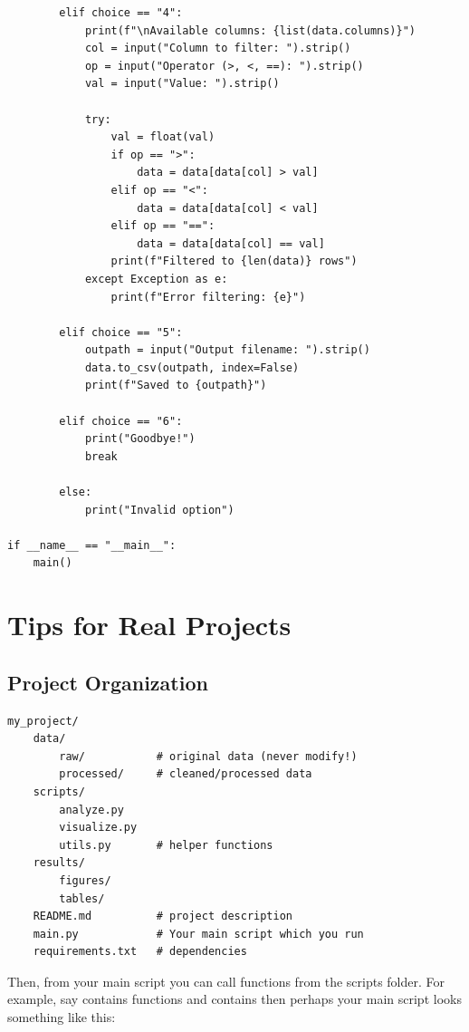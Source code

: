 \begin{lstlisting}
        elif choice == "4":
            print(f"\nAvailable columns: {list(data.columns)}")
            col = input("Column to filter: ").strip()
            op = input("Operator (>, <, ==): ").strip()
            val = input("Value: ").strip()

            try:
                val = float(val)
                if op == ">":
                    data = data[data[col] > val]
                elif op == "<":
                    data = data[data[col] < val]
                elif op == "==":
                    data = data[data[col] == val]
                print(f"Filtered to {len(data)} rows")
            except Exception as e:
                print(f"Error filtering: {e}")

        elif choice == "5":
            outpath = input("Output filename: ").strip()
            data.to_csv(outpath, index=False)
            print(f"Saved to {outpath}")

        elif choice == "6":
            print("Goodbye!")
            break

        else:
            print("Invalid option")

if __name__ == "__main__":
    main()
\end{lstlisting}

\section{Tips for Real Projects}
\label{sec:project-tips}

\subsection{Project Organization}

\begin{lstlisting}[style=shellstyle]
my_project/
    data/
        raw/           # original data (never modify!)
        processed/     # cleaned/processed data
    scripts/
        analyze.py
        visualize.py
        utils.py       # helper functions
    results/
        figures/
        tables/
    README.md          # project description
	main.py			   # Your main script which you run
    requirements.txt   # dependencies
\end{lstlisting}

Then, from your main script you can call functions from the scripts folder. For example, say  contains functions  and  contains  then perhaps your main script looks something like this:

